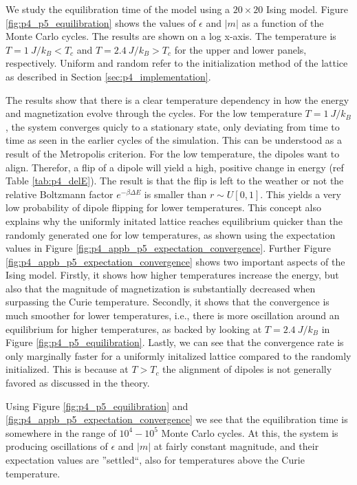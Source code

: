 \documentclass[../main_proj4_correct_template.tex]{subfiles}
\begin{document}
We study the equilibration time of the model using a $20\times 20$ Ising model. Figure \ref{fig:p4_p5_equilibration} shows the values of $\epsilon$ and $|m|$ as a function of the Monte Carlo cycles. The results are shown on a log x-axis. The temperature is $T=1~J/k_B < T_c$ and $T=2.4~J/k_B > T_c$ for the upper and lower panels, respectively. Uniform and random refer to the initialization method of the lattice as described in Section \ref{sec:p4_implementation}. 


The results show that there is a clear temperature dependency in how the energy and magnetization evolve through the cycles. For the low temperature $T=1~J/k_B$, the system converges quicly to a stationary state, only deviating from time to time as seen in the earlier cycles of the simulation. This can be understood as a result of the Metropolis criterion. For the low temperature, the dipoles want to align. Therefor, a flip of a dipole will yield a high, positive change in energy (ref Table \ref{tab:p4_delE}). The result is that the flip is left to the weather or not the relative Boltzmann factor $e^{-\beta \Delta E}$ is smaller than $r\sim U[0,1]$. This yields a very low probability of dipole flipping for lower temperatures. This concept also explains why the uniformly initated lattice reaches equilibrium quicker than the randomly generated one for low temperatures, as shown using the expectation values in Figure \ref{fig:p4_appb_p5_expectation_convergence}. Further Figure \ref{fig:p4_appb_p5_expectation_convergence} shows two important aspects of the Ising model. Firstly, it shows how higher temperatures increase the energy, but also that the magnitude of magnetization is substantially decreased when surpassing the Curie temperature. Secondly, it shows that the convergence is much smoother for lower temperatures, i.e., there is more oscillation around an equilibrium for higher temperatures, as backed by looking at $T=2.4~J/k_B$ in Figure \ref{fig:p4_p5_equilibration}. Lastly, we can see that the convergence rate is only marginally faster for a uniformly initalized lattice compared to the randomly initialized. This is because at $T>T_c$ the alignment of dipoles is not generally favored as discussed in the theory.

Using Figure \ref{fig:p4_p5_equilibration} and \ref{fig:p4_appb_p5_expectation_convergence} we see that the equilibration time is somewhere in the range of $10^{4}-10^{5}$ Monte Carlo cycles. At this, the system is producing oscillations of $\epsilon$ and $|m|$ at fairly constant magnitude, and their expectation values are ''settled``, also for temperatures above the Curie temperature.
\end{document}
